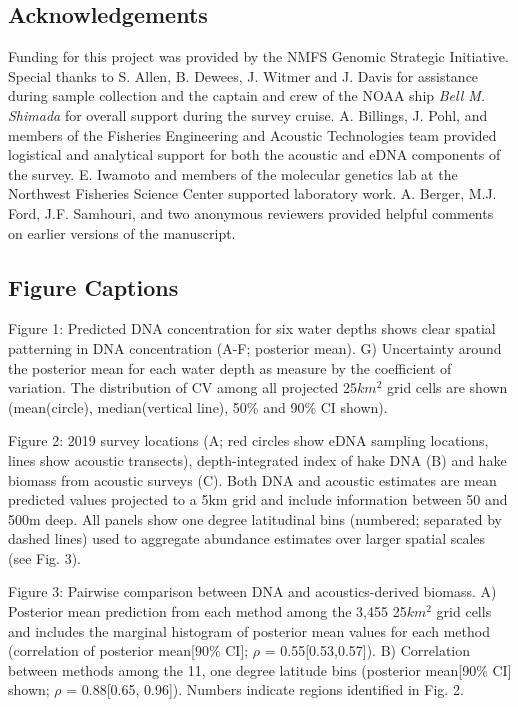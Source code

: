 \documentclass[
]{article}
\begin{document}
\hypertarget{acknowledgements}{%
\subsection{Acknowledgements}\label{acknowledgements}}

Funding for this project was provided by the NMFS Genomic Strategic
Initiative. Special thanks to S. Allen, B. Dewees, J. Witmer and J.
Davis for assistance during sample collection and the captain and crew
of the NOAA ship \emph{Bell M. Shimada} for overall support during the
survey cruise. A. Billings, J. Pohl, and members of the 
Fisheries Engineering and Acoustic Technologies team provided 
logistical and analytical support for both the acoustic and eDNA components 
of the survey. E. Iwamoto and members of the
molecular genetics lab at the Northwest Fisheries Science Center
supported laboratory work. A. Berger, M.J. Ford, J.F. Samhouri, and two 
anonymous reviewers provided helpful comments on earlier versions of the manuscript. 



\newpage
\clearpage

\subsection{Figure Captions}

Figure 1: Predicted DNA concentration for six water depths shows clear spatial patterning in DNA concentration (A-F; posterior mean). G) Uncertainty around the posterior mean for each water depth as measure by the coefficient of variation. The distribution of CV among all projected 25$km^2$ grid cells are shown (mean(circle), median(vertical line), 50\% and 90\% CI shown).

Figure 2: 2019 survey locations (A; red circles show eDNA sampling locations, lines show acoustic transects), depth-integrated  index of hake DNA (B) and hake biomass from acoustic surveys (C).  Both DNA and acoustic estimates are mean predicted values projected to a 5km grid and include information between 50 and 500m deep. All panels show one degree latitudinal bins (numbered; separated by dashed lines) used to aggregate abundance estimates over larger spatial scales (see Fig. 3).

Figure 3: Pairwise comparison between  DNA and acoustics-derived biomass. A) Posterior mean prediction from each method among the 3,455 25$km^2$ grid cells and includes the marginal histogram of posterior mean values for each method (correlation of posterior mean[90\% CI]; $\rho$ = 0.55[0.53,0.57]).  B) Correlation between methods among the 11, one degree latitude bins (posterior mean[90\% CI] shown; $\rho$ = 0.88[0.65, 0.96]). Numbers indicate regions identified in Fig. 2.
\end{document}

